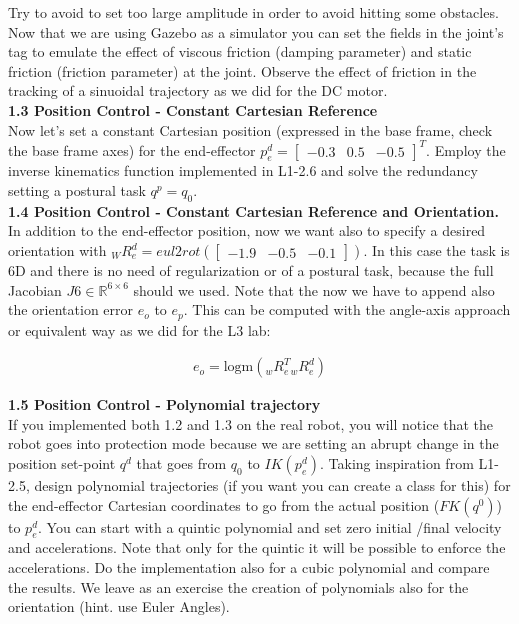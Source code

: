 \documentclass[11pt]{article}
\newcommand{\Rnum}{\mathbb{R}} %
\newcommand{\mat}[1]{\ensuremath{\begin{bmatrix}#1\end{bmatrix}}}	%
\begin{document}
 Try to avoid to set too large amplitude in order to avoid hitting some obstacles. 
 Now that we are using Gazebo as a simulator you can set the fields  in the joint's tag to emulate the effect of viscous friction (damping parameter) and static friction (friction parameter) at the joint. Observe the effect of friction in the tracking of a sinuoidal trajectory as we did for the DC motor.
 \\

\textbf{1.3 Position Control - Constant Cartesian Reference}\\
Now let's set a constant Cartesian position (expressed in the base frame, check the base frame axes) 
for the end-effector $p_e^d=\mat{-0.3&  0.5& -0.5}^T   $. Employ the inverse kinematics function implemented in L1-2.6 and solve the redundancy  setting a postural task $q^p = q_0$.\\

\textbf{1.4 Position Control - Constant Cartesian Reference and Orientation.}\\
In addition to the end-effector position, now we want also to specify a desired orientation with ${}_WR_e^d = eul2rot(\mat{-1.9& -0.5& -0.1})$.
In this case the task is 6D and there is no need of regularization or of a postural task, because the full Jacobian $J6 \in \Rnum^{6 \times 6}$ should we used. 
Note that the now we have to append also  the orientation error $e_o$  to $e_p$. This can be computed with the angle-axis approach or equivalent way as we did for the L3 lab: 

\begin{align}
e_o = \text{logm}({}_wR_e^T {}_wR_e^d)
\end{align}


\textbf{1.5 Position Control - Polynomial trajectory}\\
If you implemented both 1.2 and 1.3 on the real robot, you will notice that the robot goes into protection mode because we are setting an abrupt change in the position set-point $q^d$ that goes from $q_0$ to $IK(p_e^d)$.
Taking inspiration from L1-2.5, design polynomial  trajectories (if you want you can create a class for this) for the end-effector Cartesian coordinates to go from the actual position ($FK(q^0)$) to $p_e^d$. You can start with a quintic polynomial and set zero initial /final velocity and accelerations. Note that only for the quintic it will be possible to enforce the accelerations. Do the implementation also for a cubic polynomial and compare the results. We leave as an exercise the creation of polynomials also for the orientation (hint. use Euler Angles).\\
\end{document}
